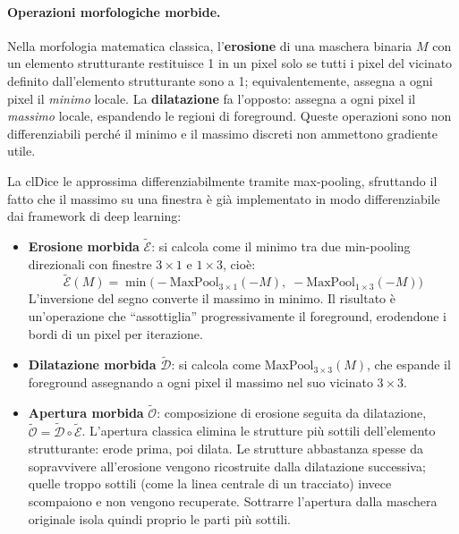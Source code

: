 \paragraph{Operazioni morfologiche morbide.}
Nella morfologia matematica classica, l'\textbf{erosione} di una maschera binaria $M$ con un elemento strutturante restituisce 1 in un pixel solo se tutti i pixel del vicinato definito dall'elemento strutturante sono a 1; equivalentemente, assegna a ogni pixel il \textit{minimo} locale. La \textbf{dilatazione} fa l'opposto: assegna a ogni pixel il \textit{massimo} locale, espandendo le regioni di foreground. Queste operazioni sono non differenziabili perché il minimo e il massimo discreti non ammettono gradiente utile.

La clDice le approssima differenziabilmente tramite max-pooling, sfruttando il fatto che il massimo su una finestra è già implementato in modo differenziabile dai framework di deep learning:

\begin{itemize}
    \item \textbf{Erosione morbida} $\widetilde{\mathcal{E}}$: si calcola come il minimo tra due min-pooling direzionali con finestre $3\times1$ e $1\times3$, cioè:
    \[
        \widetilde{\mathcal{E}}(M) = \min\!\bigl(-\mathrm{MaxPool}_{3\times1}(-M),\; -\mathrm{MaxPool}_{1\times3}(-M)\bigr)
    \]
    L'inversione del segno converte il massimo in minimo. Il risultato è un'operazione che ``assottiglia'' progressivamente il foreground, erodendone i bordi di un pixel per iterazione.
    \item \textbf{Dilatazione morbida} $\widetilde{\mathcal{D}}$: si calcola come $\mathrm{MaxPool}_{3\times3}(M)$, che espande il foreground assegnando a ogni pixel il massimo nel suo vicinato $3\times3$.
    \item \textbf{Apertura morbida} $\widetilde{\mathcal{O}}$: composizione di erosione seguita da dilatazione, $\widetilde{\mathcal{O}} = \widetilde{\mathcal{D}} \circ \widetilde{\mathcal{E}}$. L'apertura classica elimina le strutture più sottili dell'elemento strutturante: erode prima, poi dilata. Le strutture abbastanza spesse da sopravvivere all'erosione vengono ricostruite dalla dilatazione successiva; quelle troppo sottili (come la linea centrale di un tracciato) invece scompaiono e non vengono recuperate. Sottrarre l'apertura dalla maschera originale isola quindi proprio le parti più sottili.
\end{itemize}

